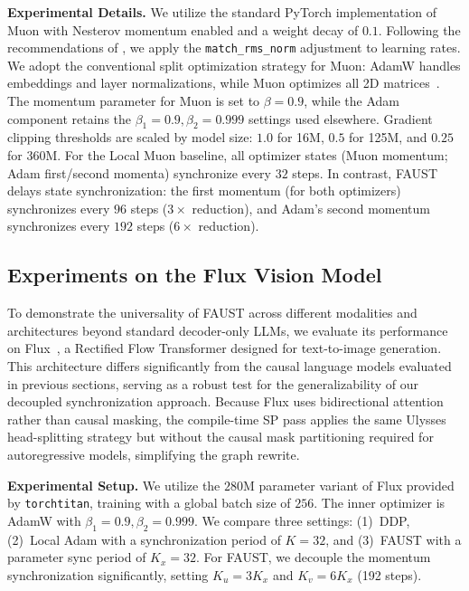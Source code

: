 \documentclass{article}
\begin{document}
\textbf{Experimental Details.} We utilize the standard PyTorch implementation of Muon with Nesterov momentum enabled and a weight decay of $0.1$. Following the recommendations of \citet{liu2025muonscalablellmtraining}, we apply the \texttt{match\_rms\_norm} adjustment to learning rates. We adopt the conventional split optimization strategy for Muon: AdamW handles embeddings and layer normalizations, while Muon optimizes all 2D matrices~\citep{jordan2024muon}. The momentum parameter for Muon is set to $\beta=0.9$, while the Adam component retains the $\beta_1=0.9, \beta_2=0.999$ settings used elsewhere. Gradient clipping thresholds are scaled by model size: $1.0$ for 16M, $0.5$ for 125M, and $0.25$ for 360M. For the Local Muon baseline, all optimizer states (Muon momentum; Adam first/second momenta) synchronize every $32$ steps. In contrast, FAUST delays state synchronization: the first momentum (for both optimizers) synchronizes every $96$ steps ($3\times$ reduction), and Adam's second momentum synchronizes every $192$ steps ($6\times$ reduction).

\subsection{Experiments on the Flux Vision Model}
\label{sec:b8_flux}

To demonstrate the universality of FAUST across different modalities and architectures beyond standard decoder-only LLMs, we evaluate its performance on Flux~\citep{sergeev2018horovodfasteasydistributed}, a Rectified Flow Transformer designed for text-to-image generation. This architecture differs significantly from the causal language models evaluated in previous sections, serving as a robust test for the generalizability of our decoupled synchronization approach. Because Flux uses bidirectional attention rather than causal masking, the compile-time SP pass applies the same Ulysses head-splitting strategy but without the causal mask partitioning required for autoregressive models, simplifying the graph rewrite.

\textbf{Experimental Setup.} We utilize the $280$M parameter variant of Flux provided by \texttt{torchtitan}, training with a global batch size of $256$. The inner optimizer is AdamW with $\beta_1=0.9, \beta_2=0.999$. We compare three settings: (1)~DDP, (2)~Local Adam with a synchronization period of $K=32$, and (3)~FAUST with a parameter sync period of $K_x=32$. For FAUST, we decouple the momentum synchronization significantly, setting $K_u=3K_x$ and $K_v=6K_x$ (192 steps).
\end{document}

